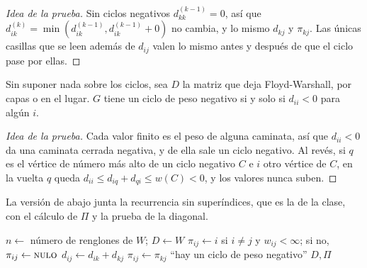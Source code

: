 \documentclass[11pt,letterpaper]{article}
\begin{document}
\begin{proof}[Idea de la prueba]
  Sin ciclos negativos $d^{(k-1)}_{kk} = 0$, así que
  $d^{(k)}_{ik} = \min(d^{(k-1)}_{ik}, d^{(k-1)}_{ik} + 0)$ no cambia,
  y lo mismo $d_{kj}$ y $\pi_{kj}$. Las únicas casillas que se leen
  además de $d_{ij}$ valen lo mismo antes y después de que el ciclo
  pase por ellas.
\end{proof}

\begin{teorema}
  \label{teo:floyd-diagonal}
  Sin suponer nada sobre los ciclos, sea $D$ la matriz que deja
  Floyd-Warshall, por capas o en el lugar. $G$ tiene un ciclo de peso
  negativo si y solo si $d_{ii} < 0$ para algún $i$.
\end{teorema}

\begin{proof}[Idea de la prueba]
  Cada valor finito es el peso de alguna caminata, así que
  $d_{ii} < 0$ da una caminata cerrada negativa, y de ella sale un
  ciclo negativo. Al revés, si $q$ es el vértice de número más alto de
  un ciclo negativo $C$ e $i$ otro vértice de $C$, en la vuelta $q$
  queda $d_{ii} \le d_{iq} + d_{qi} \le w(C) < 0$, y los valores
  nunca suben.
\end{proof}

La versión de abajo junta la recurrencia sin superíndices, que es la
de la clase, con el cálculo de $\Pi$ y la prueba de la diagonal.

\begin{algorithm}[H]
\caption{\textsc{Floyd-Warshall}$(W)$, con $\Pi$ y en el lugar}
\label{alg:floyd-warshall}
\begin{algorithmic}[1]
  \State $n \gets$ número de renglones de $W$; \quad $D \gets W$
      \State $\pi_{ij} \gets i$ si $i \neq j$ y $w_{ij} < \infty$; si
             no, $\pi_{ij} \gets \textsc{nulo}$
    \EndFor
  \EndFor
   
          \State $d_{ij} \gets d_{ik} + d_{kj}$
          \State $\pi_{ij} \gets \pi_{kj}$
        \EndIf
      \EndFor
    \EndFor
  \EndFor
      \State \Return ``hay un ciclo de peso negativo''
    \EndIf
  \EndFor
  \State \Return $D, \Pi$
\EndProcedure
\end{algorithmic}
\end{algorithm}
\end{document}
